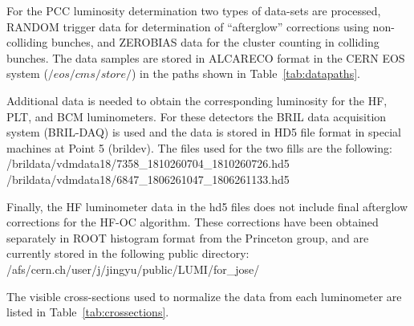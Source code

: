 
For the PCC luminosity determination two types of data-sets are processed, RANDOM trigger data for determination of ``afterglow'' corrections using non-colliding bunches, and ZEROBIAS data for the cluster counting in colliding bunches.
The data samples are stored in ALCARECO format in the CERN EOS system ($/eos/cms/store/$) in the paths shown in Table~\ref{tab:datapaths}.

Additional data is needed to obtain the corresponding luminosity for the HF, PLT, and BCM luminometers.
For these detectors the BRIL data acquisition system (BRIL-DAQ) is used and the data is stored in HD5 file format in special machines at Point 5 (brildev).
The files used for the two fills are the following:\\
{\small /brildata/vdmdata18/7358\_1810260704\_1810260726.hd5 \\
/brildata/vdmdata18/6847\_1806261047\_1806261133.hd5
}


Finally, the HF luminometer data in the hd5 files does not include final afterglow corrections for the HF-OC algorithm.
These corrections have been obtained separately in ROOT histogram format from the Princeton group, and are currently stored in the following public directory:\\
{\small /afs/cern.ch/user/j/jingyu/public/LUMI/for\_jose/}

The visible cross-sections used to normalize the data from each luminometer are listed in Table~\ref{tab:crossections}.




